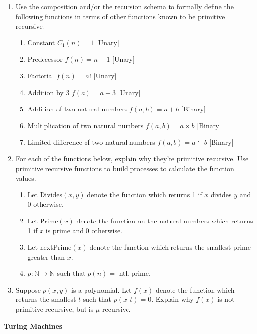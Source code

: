 \documentclass[11pt]{report}
\begin{document}
\begin{enumerate}
	\item Use the composition and/or the recursion schema to formally define the following functions in terms of other functions known to be primitive recursive.
	
		\begin{enumerate}
			\item Constant $C_{1}(n) = 1$ [Unary]
			\item Predecessor $f(n) = n - 1$ [Unary]
			\item Factorial $f(n) = n!$ [Unary]
			\item Addition by $3$ $f(a) = a + 3$ [Unary]
			\item Addition of two natural numbers $f(a,b) = a + b$ [Binary]
			\item Multiplication of two natural numbers $f(a,b) = a \times b$ [Binary]
			\item Limited difference of two natural numbers $f(a,b) = a \ \dot - \ b$ [Binary]
		\end{enumerate}

	\item For each of the functions below, explain why they're primitive recursive. Use primitive recursive functions to build processes to calculate the function values. 
	
		\begin{enumerate}
			\item Let Divides$(x,y)$ denote the function which returns 1 if $x$ divides $y$ and $0$ otherwise. 
			\item Let Prime$(x)$ denote the function on the natural numbers which returns 1 if $x$ is prime and $0$ otherwise. 
			\item Let nextPrime$(x)$ denote the function which returns the smallest prime greater than $x$. 
			\item $p: \mathbb{N} \rightarrow \mathbb{N}$ such that $p(n) = $ nth prime. 
		\end{enumerate}

	\item Suppose $p(x,y)$ is a polynomial. Let $f(x)$ denote the function which returns the smallest $t$ such that $p(x,t) = 0$. Explain why $f(x)$ is not primitive recursive, but is $\mu$-recursive. 

\end{enumerate}

\newpage
{\bf Turing Machines}
\end{document}
